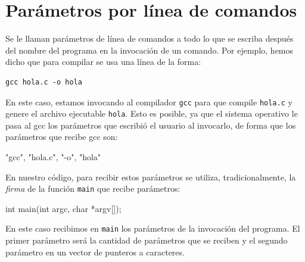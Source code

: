 
%

\renewcommand{\chaptermark}[1]{\markboth{#1}{}}
\renewcommand{\thesection}{\arabic{section}}
\chapter*{Parámetros por línea de comandos}

Se le llaman parámetros de línea de comandos a todo lo que se escriba después
del nombre del programa en la invocación de un comando. Por ejemplo, hemos
dicho que para compilar se usa una línea de la forma:

\begin{verbatim} 
gcc hola.c -o hola
\end{verbatim} 

En este caso, estamos invocando al compilador \verb!gcc! para que compile
\verb!hola.c! y genere el archivo ejecutable \verb!hola!. Esto es posible,
ya que el sistema operativo le pasa al gcc los parámetros que escribió el
usuario al invocarlo, de forma que los parámetros que recibe gcc son:

\begin{codigo-c-plano}
"gcc", "hola.c", "-o", "hola"
\end{codigo-c-plano}

En nuestro código, para recibir estos parámetros se utiliza, tradicionalmente,
la \textit{firma} de la función \lstinline!main! que recibe parámetros:
  
\begin{codigo-c-plano}
int main(int argc, char *argv[]);
\end{codigo-c-plano}

En este caso recibimos en \lstinline!main! los parámetros de la invocación
del programa.  El primer parámetro será la cantidad de parámetros que se
reciben y el segundo parámetro en un vector de punteros a caracteres.

